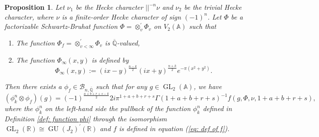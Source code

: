 \documentclass[11pt, a4paper]{amsart}
\theoremstyle{plain}
\newtheorem{proposition}[theorem]{Proposition}
\theoremstyle{definition}
\numberwithin{equation}{section}
\def\AAA{\mathbb{A}}
\def\QQ{\mathbb{Q}}
\def\RR{\mathbb{R}}
\DeclareMathOperator{\GU}{GU}
\DeclareMathOperator{\GL}{\mathrm{GL}}
\begin{document}
\begin{proposition}
\label{Prop: identify f with phi}
    Let $\nu_1$ be the Hecke character  $||^{-n}\nu$ and $\nu_2$ be the trivial Hecke character, where $\nu$ is a finite-order Hecke character of sign $(-1)^n$.
    Let $\Phi$ be a factorizable Schwartz-Bruhat function $\Phi = \otimes_{v}^{\prime} \Phi_{v}$ on $V_{2}(\AAA)$ such that 
    \begin{enumerate}
        \item The function $\Phi_{f} = \otimes_{v < \infty}^{\prime} \Phi_{v}$ is $\overline{\QQ}$-valued, 
        \item The function $\Phi_{\infty}(x, y)$ is defined by
        \begin{equation*}
                  \Phi_{\infty}(x, y) := (ix - y)^{\frac{n - k}{2}}(ix + y)^{\frac{n + k}{2}} e^{-\pi(x^2 + y^2)}. 
        \end{equation*}
    \end{enumerate}
    Then there exists a $\phi_f \in \mathcal{B}_{n, \overline{\QQ}}$ such that for any $g \in \GL_{2}(\AAA)$, we have 
    \begin{equation*}
        (\phi_{k}^{n} \otimes \phi_f)(g) = (-1)^{\frac{a + b + r + s - k}{2}} 2i \pi^{1 +a + b + r + s} \Gamma(1 + a + b + r + s)^{-1} f(g, \Phi, \nu, 1 + a + b + r +s), 
    \end{equation*}
    where the $\phi_{k}^{n}$ on the left-hand side the pullback of the function $\phi_{k}^{n}$ defined in Definition \ref{def: function phi} through the isomorphism $\GL_2(\RR) \cong \GU(J_2)^{\prime}(\RR)$ and $f$ is defined in equation (\ref{eq: def of f}). 
\end{proposition}
\end{document}

